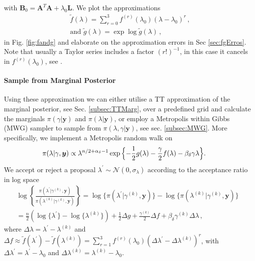 with $\bm{B}_0 = \bm{A}^T  \bm{A} + \lambda_0 \bm{L}$.
We plot the approximations
\begin{subequations}
	\label{eq:fandg}
	\begin{align}
		&\tilde{f} ( \lambda) = \sum^3_{r=0} 	f^{(r)}(\lambda_0) (\lambda-\lambda_0)^r  \label{eq:fAprox} \, ,  \\
		&\text{and } \tilde{g} (\lambda) = \exp \log{\tilde{g}(\lambda)}  \label{eq:gAprox} \, ,
	\end{align}
\end{subequations} in Fig. \ref{fig:fandg} and elaborate on the approximation errors in Sec \ref{sec:fgErros}.
Note that usually a Taylor series includes a factor $(r!)^{-1}$, in this case it cancels in $f^{(r)}(\lambda_0)$, see \cite{fox2016fast}.

\paragraph{Sample from Marginal Posterior}
Using these approximation we can either utilise a TT approximation of the marginal posterior, see Sec. \ref{subsec:TTMarg}, over a predefined grid and calculate the marginals $\pi(\gamma|\bm{y})$ and $\pi(\lambda|\bm{y})$, or employ a Metropolis within Gibbs (MWG) sampler to sample from $\pi(\lambda,\gamma|\bm{y})$, see sec. \ref{subsec:MWG}.
More specifically, we implement a Metropolis random walk on
\begin{align}
	\label{eq:margApplCondGam}
	\pi(\lambda | \gamma, \bm{y}) &\propto \lambda^{n/2 +\alpha_{\delta}-1} \exp{\Bigl\{ - \frac{1}{2} g ( \lambda) - \frac{\gamma}{2} f ( \lambda) - \beta_\delta \gamma \lambda \Bigr\}}.
\end{align} 
We accept or reject a proposal $\lambda^{\prime} \sim \mathcal{N}(0, \sigma_{\lambda})$ according to the acceptance ratio in log space
\begin{align} 
	\log \left\{ \frac{\pi(\lambda^{\prime} | \gamma^{(k)}, \bm{y})  }{\pi(\lambda^{(k)}| \gamma^{(k)}, \bm{y})}  \right\} 
	= \log  \{\pi(\lambda^{\prime} | \gamma^{(k)}, \bm{y} ) \}  -\log  \{ \pi(\lambda^{(k)}| \gamma^{(k)}, \bm{y}) \} \\
	= \frac{n}{2} (\log\{\lambda^{\prime}\} - \log\{\lambda^{(k)}\} ) + \frac{1}{2} \Delta g + \frac{\gamma^{(k)}}{2} \Delta f  + \beta_\delta \gamma^{(k)} \Delta \lambda  \, ,
\end{align}
where $\Delta \lambda = \lambda^{\prime} - \lambda^{(k)} $ and  $\Delta f \approx \tilde{f}(\lambda^\prime) - \tilde{f}(\lambda^{(k)}) = \sum^3_{r = 1} f^{(r)} (\lambda_0) (\Delta \lambda^\prime - \Delta \lambda^{(k)})^r $, with  $\Delta \lambda^{\prime} = \lambda^\prime - \lambda_0 $ and $\Delta \lambda^{(k)} =  \lambda^{(k)} - \lambda_0$.
